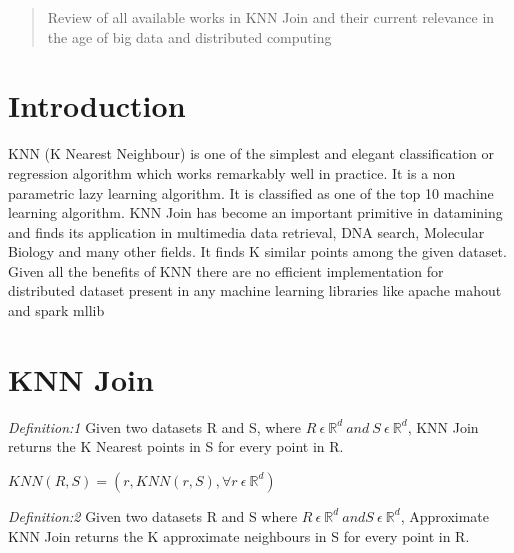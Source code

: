 \documentclass[conference]{IEEEtran}
\begin{document}
\begin{abstract}
Review of all available works in KNN Join and their current relevance
in the age of big data and distributed computing
\end{abstract}





%
\IEEEpeerreviewmaketitle



\section{Introduction}

KNN (K Nearest Neighbour) is one of the simplest and elegant
classification or regression algorithm which works remarkably well in
practice. It is a non parametric lazy learning algorithm. It is
classified as one of the top 10 machine learning algorithm. KNN Join
has become an important primitive in datamining and
finds its application in multimedia data retrieval, DNA search,
Molecular Biology  and
many other fields. It finds K similar points among the given
dataset. Given all the benefits of KNN there are no efficient
implementation for distributed dataset present in any machine learning
libraries like apache mahout and spark mllib

\section{KNN Join}

\emph{Definition:1} Given two datasets R and S, where $R\ \epsilon\
\mathbb{R}^d\ and\ S\ \epsilon\ \mathbb{R}^d$, KNN Join returns the K
Nearest points in S for every point in R.

\bigskip
     $KNN(R,S) = {(r, KNN(r,S), \forall r\ \epsilon\ \mathbb{R}^d)}$
\bigskip

\emph{Definition:2} Given two datasets R and S where $R\ \epsilon\
\mathbb{R}^d\ and S\ \epsilon\ \mathbb{R}^d$, Approximate KNN Join returns the K
approximate neighbours in S for every point in R.
\end{document}
